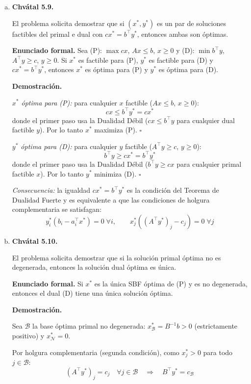\documentclass{article}
\begin{document}
\begin{enumerate}[a)]

\item \textbf{Chvátal 5.9.}

El problema solicita demostrar que si $(x^*,y^*)$ es un par de soluciones factibles del primal e dual con $cx^*=b^\top y^*$, entonces ambas son óptimas.

\textbf{Enunciado formal.} Sea (P): $\max cx$, $Ax\leq b$, $x\geq0$ y (D): $\min b^\top y$, $A^\top y\geq c$, $y\geq0$. Si $x^*$ es factible para (P), $y^*$ es factible para (D) y $cx^*=b^\top y^*$, entonces $x^*$ es óptima para (P) y $y^*$ es óptima para (D).

\textbf{Demostración.}

\textit{$x^*$ óptima para (P):} para cualquier $x$ factible ($Ax\leq b$, $x\geq0$):
$$cx \leq b^\top y^* = cx^*$$
donde el primer paso usa la Dualidad Débil ($cx\leq b^\top y$ para cualquier dual factible $y$). Por lo tanto $x^*$ maximiza (P). $\square$

\textit{$y^*$ óptima para (D):} para cualquier $y$ factible ($A^\top y\geq c$, $y\geq0$):
$$b^\top y \geq cx^* = b^\top y^*$$
donde el primer paso usa la Dualidad Débil ($b^\top y\geq cx$ para cualquier primal factible $x$). Por lo tanto $y^*$ minimiza (D). $\square$

\textit{Consecuencia:} la igualdad $cx^*=b^\top y^*$ es la condición del Teorema de Dualidad Fuerte y es equivalente a que las condiciones de holgura complementaria se satisfagan:
$$y_i^*(b_i-a_i^\top x^*)=0\;\forall i,\qquad x_j^*((A^\top y^*)_j-c_j)=0\;\forall j$$

\item \textbf{Chvátal 5.10.}

El problema solicita demostrar que si la solución primal óptima no es degenerada, entonces la solución dual óptima es única.

\textbf{Enunciado formal.} Si $x^*$ es la única SBF óptima de (P) y es no degenerada, entonces el dual (D) tiene una única solución óptima.

\textbf{Demostración.}

Sea $\mathcal{B}$ la base óptima primal no degenerada: $x_\mathcal{B}^*=B^{-1}b>0$ (estrictamente positivo) y $x_\mathcal{N}^*=0$.

Por holgura complementaria (segunda condición), como $x_j^*>0$ para todo $j\in\mathcal{B}$:
$$(A^\top y^*)_j = c_j \quad\forall j\in\mathcal{B} \quad\Longrightarrow\quad B^\top y^*=c_\mathcal{B}$$


\end{enumerate}
\end{document}
